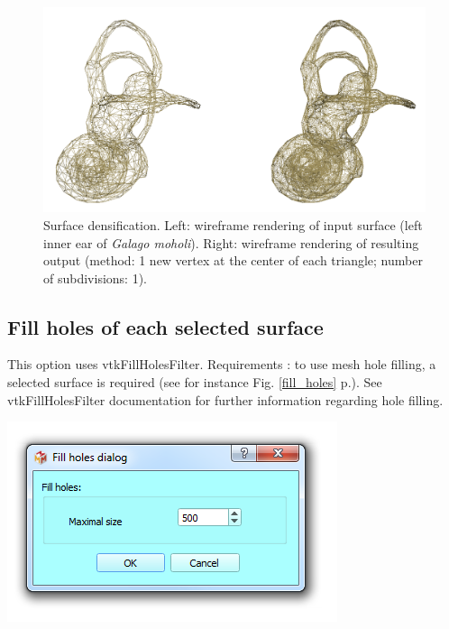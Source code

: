 \begin{figure}
  \centering
  \includegraphics[scale=0.35]{images/09/structure/densification_example.png} 
	\caption{Surface densification. Left: wireframe rendering of input surface (left inner ear of \textit{Galago moholi}). Right: wireframe rendering of resulting output (method: 1 new vertex at the center of each triangle; number of subdivisions: 1).
}
\label{densify}
 
\end{figure}




\subsection{Fill holes of each selected surface}

\noindent
\begin{minipage}{0.5\textwidth}

This option uses vtkFillHolesFilter.
Requirements : to use mesh hole filling, a selected surface is
required (see for instance Fig. \ref{fill_holes} p.\pageref{fill_holes}). See vtkFillHolesFilter documentation for further
information regarding hole filling.


\end{minipage}    
\begin{minipage}{0.5\textwidth}\centering
  \includegraphics[scale=0.5]{images/09/structure/fill_holes_dialog.png}
 \end{minipage} 
\noindent


